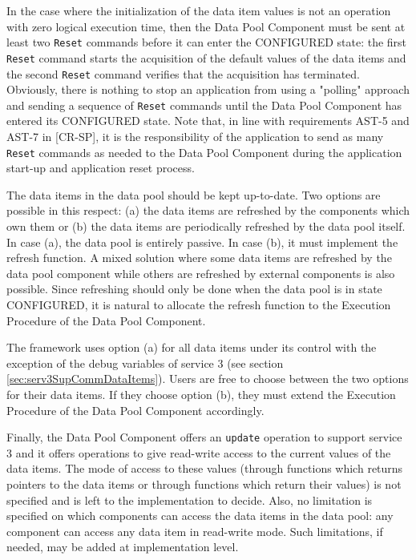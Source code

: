 \documentclass[a4paper,10pt]{article}
\begin{document}
In the case where the initialization of the data item values is not an operation with zero logical execution time, then the Data Pool Component must be sent at least two \texttt{Reset} commands before it can enter the CONFIGURED state: the first \texttt{Reset} command starts the acquisition of the default values of the data items and the second \texttt{Reset} command verifies that the acquisition has terminated. Obviously, there is nothing to stop an application from using a "polling" approach and sending a sequence of \texttt{Reset} commands until the Data Pool Component has entered its CONFIGURED state. Note that, in line with requirements AST-5 and AST-7 in [CR-SP], it is the responsibility of the application to send as many \texttt{Reset} commands as needed to the Data Pool Component during the application start-up and application reset process.

The data items in the data pool should be kept up-to-date. Two options are possible in this respect: (a) the data items are refreshed by the components which own them or (b) the data items are periodically refreshed by the data pool itself. In case (a), the data pool is entirely passive. In case (b), it must implement the refresh function. A mixed solution where some data items are refreshed by the data pool component while others are refreshed by external components is also possible. Since refreshing should only be done when the data pool is in state CONFIGURED, it is natural to allocate the refresh function to the Execution Procedure of the Data Pool Component. 

The framework uses option (a) for all data items under its control with the exception of the debug variables of service 3 (see section \ref{sec:serv3SupCommDataItems}). Users are free to choose between the two options for their data items. If they choose option (b), they must extend the Execution Procedure of the Data Pool Component accordingly.

Finally, the Data Pool Component offers an \texttt{update} operation to support service 3 and it offers operations to give read-write access to the current values of the data items. The mode of access to these values (through functions which returns pointers to the data items or through functions which return their values) is not specified and is left to the implementation to decide. Also, no limitation is specified on which components can access the data items in the data pool: any component can access any data item in read-write mode. Such limitations, if needed, may be added at implementation level. 
\end{document}
